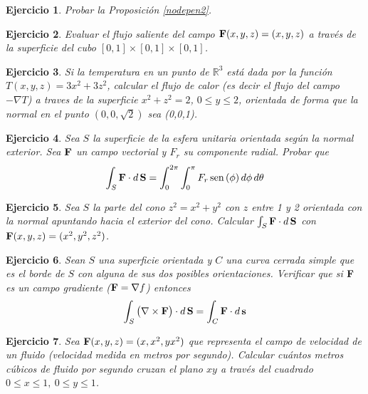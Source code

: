 \documentclass[11pt,a4paper]{amsart}
\newtheorem{ej}{Ejercicio}
\newcommand{\bej}[1]{\begin{ej}\rm{#1}}
\newcommand{\eej}{\end{ej}\vspace{-0.2cm}}
\renewcommand{\bf}{\textbf}
\newcommand{\R}{\mathbb{R}}
\newcommand{\0}{\mathbb{O}}
\newcommand{\8}{\infty}
\begin{document}
\bej Probar la Proposición \ref{nodepen2}.
\eej

\bej  Evaluar el flujo saliente del campo ${\bf F}(x,y,z)=(x,y,z)$ a
través de la superficie del cubo $[0,1]\times [0,1]\times [0,1]$.
\eej

\bej  Si la temperatura en un punto de $\R^3$ está dada por la
función $T(x,y,z)=3x^2+3z^2$, calcular el flujo de calor (es decir el
flujo del campo $-\nabla T$) a traves de la superficie $x^2+z^2=2$, $0\le
y\le 2$, orientada de forma que la normal en el punto $(0,0,\sqrt{2})$ sea
(0,0,1).
\eej

\bej  Sea $S$ la superficie de la esfera unitaria orientada según la normal
exterior. Sea ${\bf F}$ un campo vectorial y ${ F}_r$ su componente
radial. Probar que
\[
\int_S{\bf F}\cdot d\,{\bf S}=\int_0^{2\pi }\int_0^\pi F_r\text{\,sen\,}(\phi
)\,d\phi \, d\theta
\]
\eej

\bej  Sea $S$ la parte del cono $z^2=x^2+y^2$ con $z$ entre 1 y 2 orientada
con la normal apuntando hacia el exterior del cono. Calcular $\int_S{\bf F}%
\cdot d\,{\bf S}$ con ${\bf F}(x,y,z)=(x^2,y^2,z^2)$.
\eej

\bej  Sean $S$ una superficie orientada y $C$ una curva cerrada
simple que es el borde de $S$ con alguna de sus dos posibles
orientaciones. Verificar que si ${\bf F}$ es un campo gradiente
(${\bf F}=\nabla f$) entonces
\[
\int_S\big(\nabla \times {\bf F}\big)\cdot d\,{\bf S}=\int_C{\bf F}\cdot d\,{\bf s}
\]
\eej

\bej  Sea ${\bf F}(x,y,z)=(x,x^2,yx^2)$ que representa el campo de
velocidad de un fluido (velocidad medida en metros por segundo). Calcular
cuántos metros cúbicos de fluido por segundo cruzan el plano $xy$ a
través del cuadrado $0\le x\le 1,\ 0\le y\le 1$.
\eej
\end{document}

